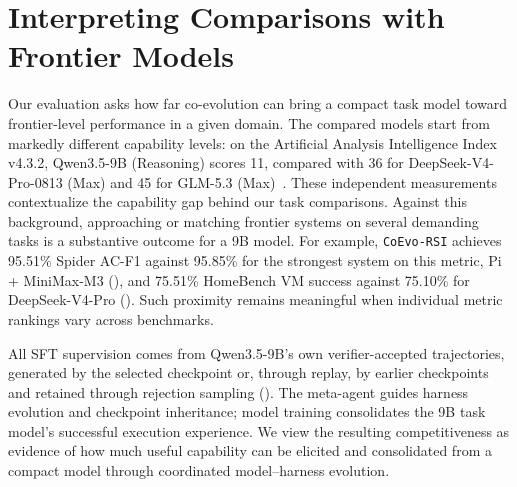 \documentclass[11pt,a4paper]{article}
\newcommand{\ourmethod}{\texttt{CoEvo-RSI}}
\begin{document}
\section{Interpreting Comparisons with Frontier Models}
\label{app:frontier-comparisons}

Our evaluation asks how far co-evolution can bring a compact task model toward frontier-level performance in a given domain. The compared models start from markedly different capability levels: on the Artificial Analysis Intelligence Index v4.3.2, Qwen3.5-9B (Reasoning) scores 11, compared with 36 for DeepSeek-V4-Pro-0813 (Max) and 45 for GLM-5.3 (Max)~\citep{artificialanalysis2026deepseekv4pro,artificialanalysis2026glm53,artificialanalysis2026qwen9b}. These independent measurements contextualize the capability gap behind our task comparisons. Against this background, approaching or matching frontier systems on several demanding tasks is a substantive outcome for a 9B model. For example, \ourmethod{} achieves 95.51\% Spider AC-F1 against 95.85\% for the strongest system on this metric, Pi + MiniMax-M3 (), and 75.51\% HomeBench VM success against 75.10\% for DeepSeek-V4-Pro (). Such proximity remains meaningful when individual metric rankings vary across benchmarks.

All SFT supervision comes from Qwen3.5-9B's own verifier-accepted trajectories, generated by the selected checkpoint or, through replay, by earlier checkpoints and retained through rejection sampling (). The meta-agent guides harness evolution and checkpoint inheritance; model training consolidates the 9B task model's successful execution experience. We view the resulting competitiveness as evidence of how much useful capability can be elicited and consolidated from a compact model through coordinated model--harness evolution.
\end{document}

